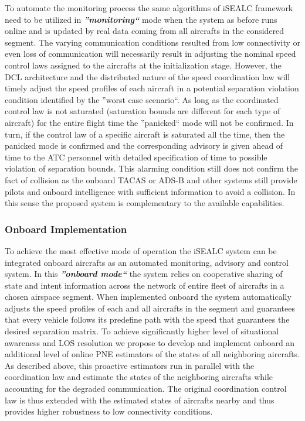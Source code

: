 \documentclass[letter,onecolumn,12pt]{aiaa-tc}
\newcommand{\1}{1_n}
\begin{document}
To automate the monitoring process the same algorithms of iSEALC framework need to be utilized in \textbf{\emph{''monitoring``}} mode when the system as before runs online and is updated by real data coming from all aircrafts in the considered segment. The varying communication conditions resulted from low connectivity or even loss of communication will necessarily result in adjusting the nominal speed control laws assigned to the aircrafts at the initialization stage. However, the DCL architecture and the distributed nature of the speed coordination law will timely adjust the speed profiles of each aircraft in a potential separation violation condition identified by the ''worst case scenario``. As long as the coordinated control law is not saturated (saturation bounds are different for each type of aircraft)  for the entire flight time the ''panicked`` mode will not be confirmed. In turn, if the control law of a specific aircraft is saturated all the time, then the panicked mode is confirmed and the corresponding advisory is given ahead of time to the ATC personnel with detailed specification of time to possible violation of separation bounds. This alarming condition still does not confirm the fact of collision as the onboard TACAS or ADS-B and other systems still provide pilots and onboard intelligence with sufficient information to avoid a collision. In this sense the proposed system is complementary to the available capabilities.

\subsubsection{Onboard Implementation}

To achieve the most effective mode of operation the iSEALC system can be integrated onboard aircrafts as an automated monitoring, advisory and control system. In this \textbf{\emph{''onboard mode``}} the system relies on cooperative sharing of state and intent information across the network of entire fleet of aircrafts in a chosen airspace segment. When implemented onboard the system automatically adjusts the speed profiles of each and all aircrafts in the segment and guarantees that every vehicle follows its predefine path with the speed that guarantees the desired separation matrix. To achieve significantly higher level of situational awareness and LOS resolution we propose to develop and implement onboard an additional level of online PNE estimators of the states of all neighboring aircrafts. As described above, this proactive estimators run in parallel with the coordination law and estimate the states of the neighboring aircrafts while accounting for the degraded communication. The original coordination control law is thus extended with the estimated states of aircrafts nearby and thus provides higher robustness to low connectivity conditions.
\end{document}
